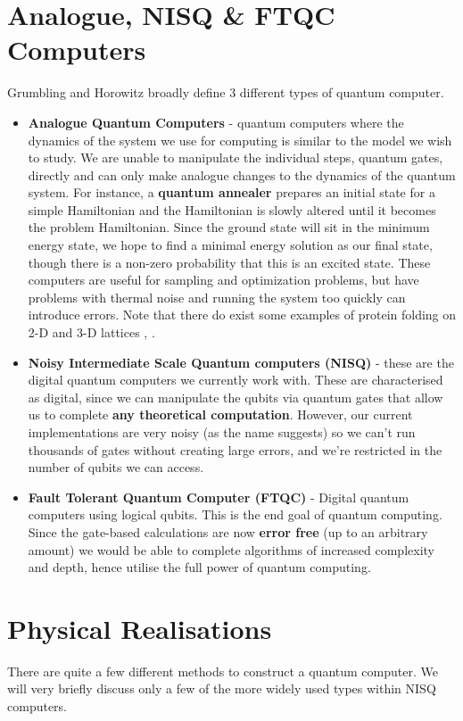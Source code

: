 \documentclass{article}
\theoremstyle{definition}
\begin{document}
\section{Analogue, NISQ \& FTQC Computers}
Grumbling and Horowitz \cite{NAP25196} broadly define 3 different types of quantum computer. 
\begin{itemize}
    \item \textbf{Analogue Quantum Computers} - quantum computers where the dynamics of the system we use for computing is similar to the model we wish to study. We are unable to manipulate the individual steps, quantum gates, directly and can only make analogue changes to the dynamics of the quantum system. For instance, a \textbf{quantum annealer} prepares an initial state for a simple Hamiltonian and the Hamiltonian is slowly altered until it becomes the problem Hamiltonian. Since the ground state will sit in the minimum energy state, we hope to find a minimal energy solution as our final state, though there is a non-zero probability that this is an excited state. These computers are useful for sampling and optimization problems, but have problems with thermal noise and running the system too quickly can introduce errors. Note that there do exist some examples of protein folding on 2-D and 3-D lattices \cite{perdomoortiz2012finding}, \cite{babej2018coarsegrained}. 
    \item \textbf{Noisy Intermediate Scale Quantum computers (NISQ)} - these are the digital quantum computers we currently work with. These are characterised as digital, since we can manipulate the qubits via quantum gates that allow us to complete \textbf{any theoretical computation}. However, our current implementations are very noisy (as the name suggests) so we can't run thousands of gates without creating large errors, and we're restricted in the number of qubits we can access.
    \item \textbf{Fault Tolerant Quantum Computer (FTQC)} - Digital quantum computers using logical qubits. This is the end goal of quantum computing. Since the gate-based calculations are now \textbf{error free} (up to an arbitrary amount) we would be able to complete algorithms of increased complexity and depth, hence utilise the full power of quantum computing.
\end{itemize}

\section{Physical Realisations}
There are quite a few different methods to construct a quantum computer. We will very briefly discuss only a few of the more widely used types within NISQ computers.
\end{document}
